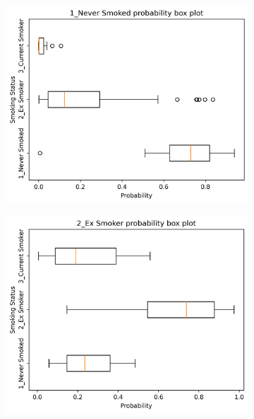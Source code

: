 \documentclass{article} %
\begin{document}
\begin{figure}[htb]
    \centering
    \begin{subfigure}{0.48\linewidth}
        \centering
        \includegraphics[width=\linewidth]{cohort1/test_boxplot_1.png}
    \end{subfigure}
    \hfill
    \begin{subfigure}{0.48\linewidth}
        \centering
        \includegraphics[width=\linewidth]{cohort1/test_boxplot_2.png}
    \end{subfigure}
    \begin{subfigure}{0.48\linewidth}

\end{subfigure}
\end{figure}
\end{document}
